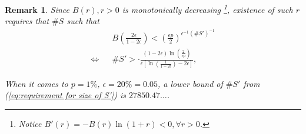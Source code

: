 \documentclass[11pt]{article}
\theoremstyle{numberplain}
\theoremstyle{nonumberplain}
\newtheorem{rem}{Remark}
\newcommand{\0}{{\mathbf{0}}}
\begin{document}
\begin{rem}
Since $B(r),r>0$ is monotonically decreasing
\footnote{ Notice $B'(r)=-B(r)\ln (1+r)<0,\forall r>0$.},
existence of such $r$ requires that $\# S $ such that
\begin{eqnarray}
&& B\left( \frac{2\epsilon}{1-2\epsilon} \right) < \left( \frac{\epsilon p}{2} \right)^{\epsilon^{-1}(\# S')^{-1}}
\label{eq:B(r) efficient bound from selection of r}
\\
\Leftrightarrow && \# S' >\cdot \frac{(1-2\epsilon)\ln\left(\frac{2}{\epsilon p}  \right)}{\epsilon\left[\ln\left(\frac{1}{1-2\epsilon}\right)-2\epsilon\right]},
\label{eq:requirement for size of S'}
\end{eqnarray}


When it comes to $p=1\%$, $\epsilon=20\%=0.05$, a lower bound of $\#S'$ from (\ref{eq:requirement for size of S'}) is $27850.47\ldots$.
\end{rem}

%
%
%
\end{document}
